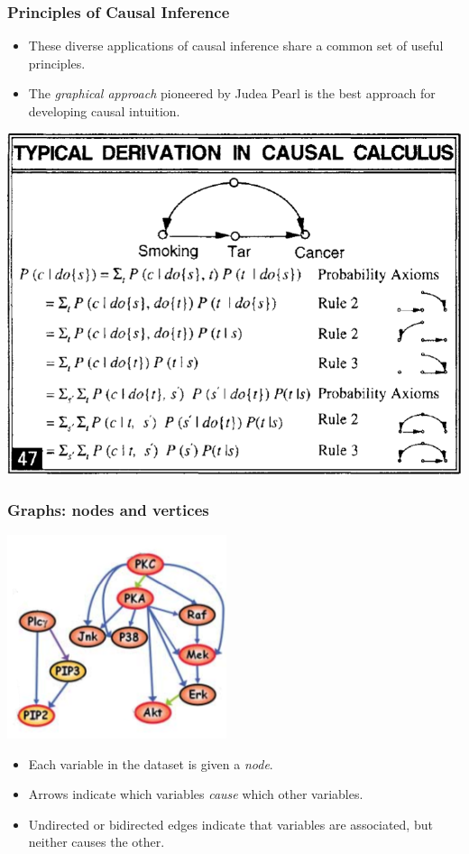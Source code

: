 \documentclass{beamer}
\begin{document}
\begin{frame}
\frametitle{Principles of Causal Inference}

\begin{itemize}
\item These diverse applications of causal inference share a common set of useful principles.
\item The \emph{graphical approach} pioneered by Judea Pearl is the best approach for developing causal intuition.
\end{itemize}

\begin{center}
\includegraphics[scale = 0.2]{../images/pearl47.png}
\end{center}

\end{frame}

\begin{frame}
\frametitle{Graphs: nodes and vertices}

\begin{center}
\includegraphics[scale = 0.5]{../images/cyto_result_cropped3.png}
\end{center}

\begin{itemize}
\item Each variable in the dataset is given a \emph{node}.
\item Arrows indicate which variables \emph{cause} which other variables.
\item Undirected or bidirected edges indicate that variables are associated, but neither causes the other.
\end{itemize}

\end{frame}
\end{document}
